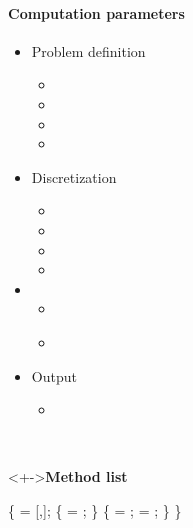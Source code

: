 \begin{frame}[fragile] 
\secframetitle{\ssParameters}
 \framesubtitle{Computation parameters}
\vspace{-0.2in}
\begin{minipage}[t]{1.80in}
\begin{itemize}
\item Problem definition
  \begin{itemize}
  \item {}
  \item {}
  \item {}
  \item {}
  \end{itemize}
\item Discretization
  \begin{itemize}
  \item {}
  \item {}
  \item {}
  \item {}
  \end{itemize}
\item {}
  \begin{itemize}
  \item {}
  \item \textcolor{red!50!black}{}
  \end{itemize}
\item Output
  \begin{itemize}
    \item {}
  \end{itemize}
\end{itemize}
\end{minipage} \
\begin{minipage}[t]{2.50in}
\vspace{-0.2in}
 \begin{block}<+->{\textbf{Method list}}
 \footnotesize \vspace{-0.1in}
\begin{semiverbatim}
 \{
    = [,];
    \{
       = ;
   \}
    \{
         = ;
        = \valuetext{true};
   \}
\}
\end{semiverbatim}
\end{block}
\end{minipage}
\end{frame}

